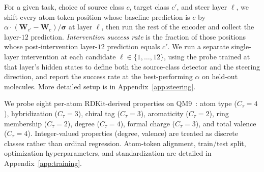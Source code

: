  For a given task, choice of source class $c$, target class $c'$, and steer layer $\ell$, we shift every atom-token position whose baseline prediction is $c$ by $\alpha \cdot (\mathbf{W}_{c'}-\mathbf{W}_{c})/\boldsymbol{\sigma}$ at layer $\ell$, then run the rest of the encoder and collect the layer-$12$ prediction. \emph{Intervention success rate} is the fraction of those positions whose post-intervention layer-$12$ prediction equals $c'$. We run a separate single-layer intervention at each candidate $\ell \in \{1, \ldots, 12\}$, using the probe trained at that layer's hidden states to define both the source-class detector and the steering direction, and report the success rate at the best-performing $\alpha$ on held-out molecules. More detailed setup is in Appendix~\ref{app:steering}.

 We probe eight per-atom RDKit-derived properties on QM9~\citep{ramakrishnan2014quantum}: atom type ($C_\tau{=}4$), hybridization ($C_\tau{=}3$), chiral tag ($C_\tau{=}3$), aromaticity ($C_\tau{=}2$), ring membership ($C_\tau{=}2$), degree ($C_\tau{=}4$), formal charge ($C_\tau{=}3$), and total valence ($C_\tau{=}4$). Integer-valued properties (degree, valence) are treated as discrete classes rather than ordinal regression. Atom-token alignment, train/test split, optimization hyperparameters, and standardization are detailed in Appendix~\ref{app:training}.






